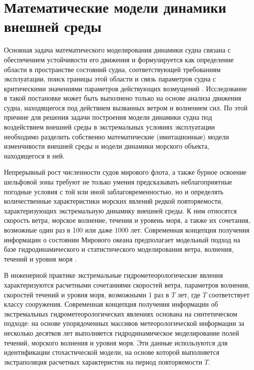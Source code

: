 \section{Математические модели динамики внешней среды}

Основная задача математического моделирования динамики судна связана с обеспечением устойчивости его движения и формулируется как определение области в пространстве состояний судна, соответствующей требованиям эксплуатации, поиск границы этой области и связь параметров судна с критическими значениями параметров действующих возмущений \citep{dk1}. Исследование в такой постановке может быть выполнено только на основе анализа движения судна, находящегося под действием вызванных ветром и волнением сил. По этой причине для решения задачи построения модели динамики судна под воздействием внешней среды в экстремальных условиях эксплуатации необходимо разделить собственно математические (имитационные) модели изменчивости внешней среды и модели динамики морского объекта, находящегося в ней.

Непрерывный рост численности судов мирового флота, а также бурное освоение шельфовой зоны требуют не только умения предсказывать неблагоприятные погодные условия с той или иной заблаговременностью, но и определять количественные характеристики морских явлений редкой повторяемости, характеризующих экстремальную динамику внешней среды. К ним относятся скорость ветра, морское волнение, течения и уровень моря, а также их сочетания, возможные один раз в 100 или даже 1000 лет. Современная концепция получения информации о состоянии Мирового океана предполагает модельный подход на базе гидродинамического и статистического моделирования ветра, волнения, течений и уровня моря \citep{dk2}.

В инженерной практике экстремальные гидрометеорологические явления характеризуются расчетными сочетаниями скоростей ветра, параметров волнения, скоростей течений и уровня моря, возможными 1 раз в $T$ лет, где $T$ соответствует классу сооружения. Современная концепция получения информации об экстремальных гидрометеорологических явлениях основана на синтетическом подходе: на основе упорядоченных массивов метеорологической информации за несколько десятков лет выполняется гидродинамическое моделирование полей течений, морского волнения и уровня моря. Эти данные используются для идентификации стохастической модели, на основе которой выполняется экстраполяция расчетных характеристик на период повторяемости $T$. 

